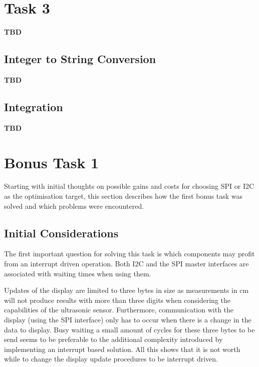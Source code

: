 	\section{Task 3} %
	\label{sec:impl_task_3}
		\textbf{TBD}
		
		\subsection{Integer to String Conversion} %
		\label{sub:integer_to_string_conversion}
			\textbf{TBD}

		\subsection{Integration} %
		\label{sub:integration}
			\textbf{TBD}

	\section{Bonus Task 1} %
	\label{sec:impl_bonus_task_1}
		Starting with initial thoughts on possible gains and costs for choosing SPI or I2C as the optimisation target, this section describes how the first bonus task was solved and which problems were encountered.

		\subsection{Initial Considerations} %
		\label{sub:initial_considerations}
			The first important question for solving this task is which components may profit from an interrupt driven operation. Both I2C and the SPI master interfaces are associated with waiting times when using them. 

			Updates of the display are limited to three bytes in size as measurements in cm will not produce results with more than three digits when considering the capabilities of the ultrasonic sensor. Furthermore, communication with the display (using the SPI interface) only has to occur when there is a change in the data to display. Busy waiting a small amount of cycles for these three bytes to be send seems to be preferable to the additional complexity introduced by implementing an interrupt based solution.
			All this shows that it is not worth while to change the display update procedures to be interrupt driven.

